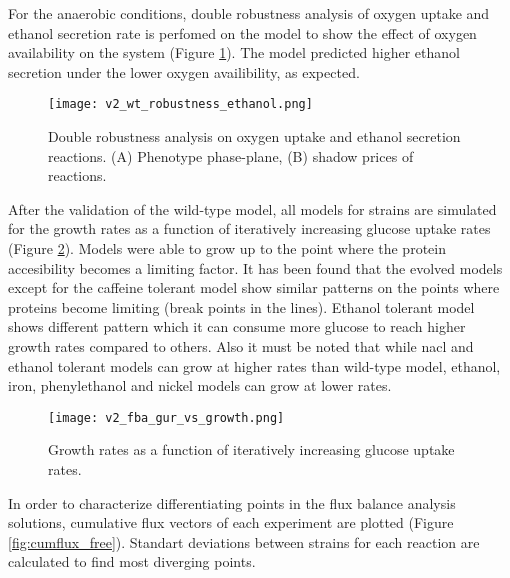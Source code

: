 \ifnotskip
For the anaerobic conditions, double robustness analysis of oxygen uptake and ethanol secretion rate is perfomed on the model to show the effect of oxygen availability on the system (Figure \ref{fig:v2_wt_robustness_ethanol}). The model predicted higher ethanol secretion under the lower oxygen availibility, as expected.

\begin{figure}[H]
\begin{center}
\texttt{[image: v2\_wt\_robustness\_ethanol.png]}
\caption[Double robustness analysis on oxygen uptake and ethanol secretion reactions]{Double robustness analysis on oxygen uptake and ethanol secretion reactions. (A) Phenotype phase-plane, (B) shadow prices of reactions.}
\end{center}
\label{fig:v2_wt_robustness_ethanol}
\end{figure}
\fi


After the validation of the wild-type model, all models for strains are simulated for the growth rates as a function of iteratively increasing glucose uptake rates (Figure \ref{fig:v2_fba_gur_vs_growth}). Models were able to grow up to the point where the protein accesibility becomes a limiting factor. It has been found that the evolved models except for the caffeine tolerant model show similar patterns on the points where proteins become limiting (break points in the lines). Ethanol tolerant model shows different pattern which it can consume more glucose to reach higher growth rates compared to others. Also it must be noted that while nacl and ethanol tolerant models can grow at higher rates than wild-type model, ethanol, iron, phenylethanol and nickel models can grow at lower rates.

\begin{figure}[H]
\begin{center}
\texttt{[image: v2\_fba\_gur\_vs\_growth.png]}
\caption[Growth rates as a function of iteratively increasing glucose uptake rates]{Growth rates as a function of iteratively increasing glucose uptake rates.}
\end{center}
\label{fig:v2_fba_gur_vs_growth}
\end{figure}
\vspace{-1.0cm}

In order to characterize differentiating points in the flux balance analysis solutions, cumulative flux vectors of each experiment are plotted (Figure \ref{fig:cumflux_free}). Standart deviations between strains for each reaction are calculated to find most diverging points.

